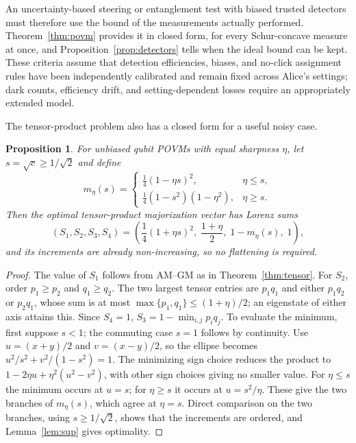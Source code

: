 \documentclass[aps,pra,twocolumn,superscriptaddress,nofootinbib,floatfix]{revtex4-2}
\newtheorem{proposition}{Proposition}
\theoremstyle{definition}
\newcommand{\sqc}{\sqrt{c}}
\begin{document}
An uncertainty-based steering or entanglement test with biased trusted
detectors must therefore use the bound of the measurements actually performed.
Theorem~\ref{thm:povm} provides it in closed form, for every Schur-concave
measure at once, and Proposition~\ref{prop:detectors} tells when the ideal bound
can be kept. These criteria assume that detection efficiencies, biases, and
no-click assignment rules have been independently calibrated and remain fixed
across Alice's settings; dark counts, efficiency drift, and setting-dependent
losses require an appropriately extended model.

The tensor-product problem also has a closed form for a useful noisy case.

\begin{proposition}
\label{prop:noisy-tensor}
For unbiased qubit POVMs with equal sharpness $\eta$, let $s=\sqc\ge1/\sqrt2$ and define
\begin{equation}
  m_\eta(s)=
  \begin{cases}
    \frac14(1-\eta s)^2,&\eta\le s,\\[2pt]
    \frac14(1-s^2)(1-\eta^2),&\eta\ge s.
  \end{cases}
  \label{eq:noisy-tensor-m}
\end{equation}
Then the optimal tensor-product majorization vector has Lorenz sums
\begin{equation}
  (S_1,S_2,S_3,S_4)=
  \left(\frac14(1+\eta s)^2,\;\frac{1+\eta}{2},\;1-m_\eta(s),\;1\right),
  \label{eq:noisy-tensor-sums}
\end{equation}
and its increments are already non-increasing, so no flattening is required.
\end{proposition}

\begin{proof}
The value of $S_1$ follows from AM--GM as in Theorem~\ref{thm:tensor}. For $S_2$,
order $p_1\ge p_2$ and $q_1\ge q_2$. The two largest tensor entries are $p_1q_1$
and either $p_1q_2$ or $p_2q_1$, whose sum is at most $\max\{p_1,q_1\}\le(1+\eta)/2$;
an eigenstate of either axis attains this. Since $S_4=1$, $S_3=1-\min_{i,j}p_iq_j$.
To evaluate the minimum, first suppose $s<1$; the commuting case $s=1$ follows
by continuity. Use $u=(x+y)/2$ and $v=(x-y)/2$, so the ellipse becomes
$u^2/s^2+v^2/(1-s^2)=1$. The minimizing sign choice reduces the product to
$1-2\eta u+\eta^2(u^2-v^2)$, with other sign choices giving no smaller value.
For $\eta\le s$ the minimum occurs at $u=s$; for $\eta\ge s$ it occurs at
$u=s^2/\eta$. These give the two branches of $m_\eta(s)$, which agree at $\eta=s$.
Direct comparison on the two branches, using $s\ge1/\sqrt2$, shows that the
increments are ordered, and Lemma~\ref{lem:sup} gives optimality.
\end{proof}
\end{document}

